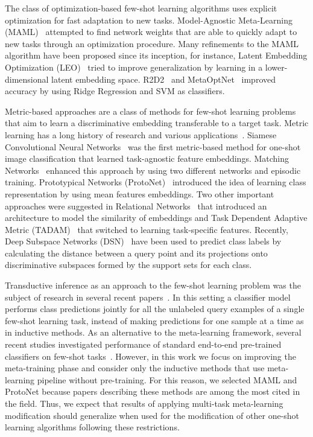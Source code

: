 \documentclass{article}
\begin{document}
The class of optimization-based few-shot learning algorithms uses explicit optimization for fast adaptation to new tasks. Model-Agnostic Meta-Learning (MAML)~\cite{finn2017model} attempted to find network weights that are able to quickly adapt to new tasks through an optimization procedure. Many refinements to the MAML algorithm have been proposed since its inception, for instance, Latent Embedding Optimization (LEO)~\cite{rusu2018meta} tried to improve generalization by learning in a lower-dimensional latent embedding space. R2D2~\cite{bertinetto2018metalearning} and MetaOptNet~\cite{8954109} improved accuracy by using Ridge Regression and SVM as classifiers.

Metric-based approaches are a class of methods for few-shot learning problems that aim to learn a discriminative embedding transferable to a target task. Metric learning has a long history of research and various applications~\cite{boiarov2019large,musgrave2020metric}. Siamese Convolutional Neural Networks~\cite{koch2015siamese} was the first metric-based method for one-shot image classification that learned task-agnostic feature embeddings. Matching Networks~\cite{vinyals2016matching} enhanced this approach by using two different networks and episodic training. Prototypical Networks (ProtoNet)~\cite{NIPS2017_cb8da676} introduced the idea of learning class representation by using mean features embeddings. Two other important approaches were suggested in Relational Networks~\cite{sung2018learning} that introduced an architecture to model the similarity of embeddings and Task Dependent Adaptive Metric (TADAM)~\cite{NEURIPS2018_66808e32} that switched to learning task-specific features. Recently, Deep Subspace Networks (DSN)~\cite{simon2020adaptive} have been used to predict class labels by calculating the distance between a query point and its projections onto discriminative subspaces formed by the support sets for each class.






Transductive inference as an approach to the few-shot learning problem was the subject of research in several recent papers~\cite{Dhillon2020A}. In this setting a classifier model performs class predictions jointly for all the unlabeled query examples of a single few-shot learning task, instead of making predictions for one sample at a time as in inductive methods. As an alternative to the meta-learning framework, several recent studies investigated performance of standard end-to-end pre-trained classifiers on few-shot tasks~\cite{chen2019closer,tian2020rethinking,Dhillon2020A}. However, in this work we focus on improving the meta-training phase and consider only the inductive methods that use meta-learning pipeline without pre-training. For this reason, we selected MAML and ProtoNet because papers describing these methods are among the most cited in the field. Thus, we expect that results of applying multi-task meta-learning modification should generalize when used for the modification of other one-shot learning algorithms following these restrictions.
\end{document}
